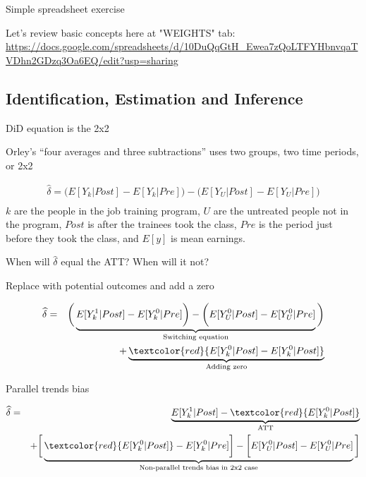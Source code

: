 \documentclass{beamer}
\begin{document}
\begin{frame}{Simple spreadsheet exercise}

Let's review basic concepts here at "WEIGHTS" tab: \url{https://docs.google.com/spreadsheets/d/10DuQqGtH_Ewea7zQoLTFYHbnvqaTVDhn2GDzq3Oa6EQ/edit?usp=sharing}

\end{frame}

\subsection{Identification, Estimation and Inference}


\begin{frame}{DiD equation is the 2x2}

Orley's ``four averages and three subtractions'' uses two groups, two time periods, or 2x2

\begin{eqnarray*}
\widehat{\delta} = \bigg ( E[Y_k|Post] - E[Y_k|Pre] \bigg ) - \bigg ( E[Y_U | Post ] - E[ Y_U | Pre] \bigg) \\
\end{eqnarray*}$k$ are the people in the job training program, $U$ are the untreated people not in the program, $Post$ is after the trainees took the class, $Pre$ is the period just before they took the class, and $E[y]$ is mean earnings. 

\bigskip

When will $\widehat{\delta}$ equal the ATT?  When will it not?

\end{frame}



\begin{frame}{Replace with potential outcomes and add a zero}

\begin{eqnarray*}
\widehat{\delta} &=& \bigg ( \underbrace{E[Y^1_k|Post] - E[Y^0_k|Pre] \bigg ) - \bigg ( E[Y^0_U | Post ] - E[ Y^0_U | Pre]}_{\mathclap{\text{Switching equation}}} \bigg)  \\
&&+ \underbrace{\textcolor{red}{E[Y_k^0 |Post] - E[Y^0_k | Post]}}_{\mathclap{\text{Adding zero}}} 
\end{eqnarray*}

\end{frame}

\begin{frame}{Parallel trends bias}

\begin{eqnarray*}
\widehat{\delta} &=& \underbrace{E[Y^1_k | Post] - \textcolor{red}{E[Y^0_k | Post]}}_{\mathclap{\text{ATT}}} \\
&& + \bigg [  \underbrace{\textcolor{red}{E[Y^0_k | Post]} - E[Y^0_k | Pre] \bigg ] - \bigg [ E[Y^0_U | Post] - E[Y_U^0 | Pre] }_{\mathclap{\text{Non-parallel trends bias in 2x2 case}}} \bigg ]
\end{eqnarray*}


\end{frame}
\end{document}
